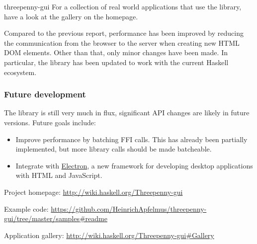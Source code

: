 \begin{hcarentry}{threepenny-gui}
For a collection of real world applications that use the library, have a look
at the gallery on the homepage.

Compared to the previous report, performance has been improved by reducing the communication from the browser to the server when creating new HTML DOM elements. Other than that, only minor changes have been made.
In particular, the library has been updated to work with the current Haskell ecosystem.

\subsubsection*{Future development}

The library is still very much in flux, significant API changes are likely in future versions. Future goals include:

\begin{itemize}
    \item Improve performance by batching FFI calls.
        This has already been partially implemented,
        but more library calls should be made batcheable.
    \item Integrate with \href{http://electron.atom.io/}{Electron}, a new framework for developing desktop applications with HTML and JavaScript.
\end{itemize}

\FurtherReading
\begin{compactitem}
\item Project homepage: \url{http://wiki.haskell.org/Threepenny-gui}
\item Example code: \url{https://github.com/HeinrichApfelmus/threepenny-gui/tree/master/samples#readme}
\item Application gallery: \url{http://wiki.haskell.org/Threepenny-gui#Gallery}
\end{compactitem}
\end{hcarentry}

